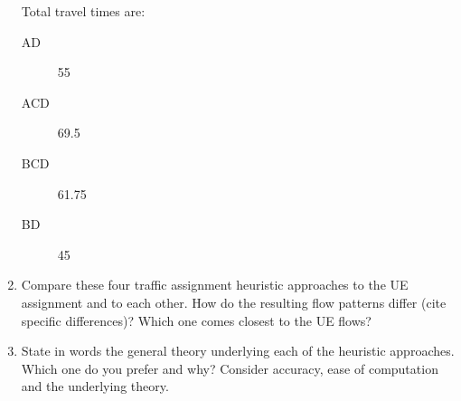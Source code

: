 \documentclass{texMemo}\usepackage[]{graphicx}\usepackage[]{color}
\begin{document}
\begin{enumerate}
\begin{center}
\end{center}
Total travel times are:
\begin{description}
\item[AD]{55}
\item[ACD]{69.5}
\item[BCD]{61.75}
\item[BD]{45}
\end{description}

\item{Compare these four traffic assignment heuristic approaches to the UE
assignment  and to each other. How do the resulting flow patterns differ (cite
specific  differences)? Which one comes closest to the UE flows?}

\item{State in words the general theory underlying each of the heuristic
approaches.  Which one do you prefer and why? Consider accuracy, ease of
computation and  the underlying theory.}
\end{enumerate}
\end{document}
